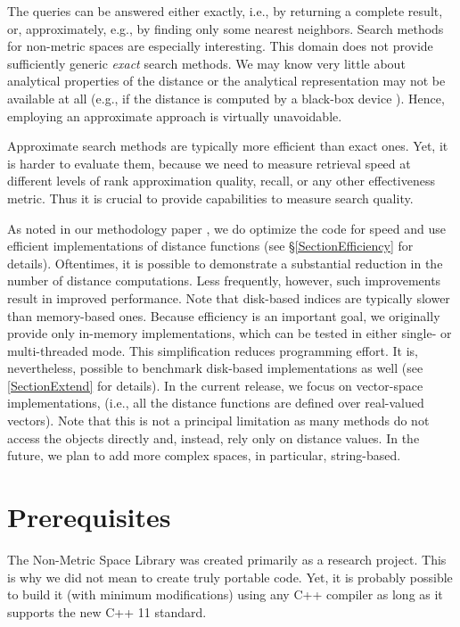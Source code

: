 \documentclass[runningheads,a4paper]{llncs}
\begin{document}
{The queries can be answered either exactly, 
i.e., by returning a complete result, or, 
approximately, e.g., by finding only some nearest neighbors.
Search methods for non-metric spaces are especially interesting.
This domain does not provide sufficiently generic \emph{exact} search methods.
We may know very little about analytical properties of the distance
or the analytical representation may not be available at all (e.g., if the 
distance is computed by a black-box device \cite{Skopal:2007}).
Hence, employing an approximate approach is virtually unavoidable.

Approximate search methods are typically more efficient than exact ones.
Yet, it is harder to evaluate them,
because we need to measure retrieval speed at different levels of 
rank approximation quality, recall, or any other effectiveness metric.
Thus it is crucial to provide capabilities to measure search quality.

As noted in our methodology paper \cite{Boytsov_and_Bilegsaikhan:sisap2013},
we do optimize the code for speed and use efficient implementations of distance functions 
(see \S \ref{SectionEfficiency} for details).
Oftentimes, it is possible to demonstrate a substantial reduction in the number
of distance computations. 
Less frequently, however, such improvements result in improved performance.
Note that  disk-based indices are typically
slower than memory-based ones. 
Because efficiency is an important goal,
we originally provide only in-memory implementations,
which can be tested in either single- or multi-threaded mode.
This simplification reduces programming effort.
It is, nevertheless, possible to benchmark disk-based implementations as well (see \ref{SectionExtend} for details).
In the current release, we focus on vector-space implementations,
(i.e., all the distance functions are defined over real-valued vectors). 
Note that this is not a principal limitation as many methods do not access the objects
directly and, instead, rely only on distance values.
In the future, we plan to add more complex spaces, in particular, string-based.


\section{Prerequisites}
The Non-Metric Space Library was created primarily as a research project.
This is why we did not mean to create truly portable code.
Yet, it is probably possible to build it (with minimum modifications) 
using any C++ compiler as long as it supports the new C++ 11 standard.

}
\end{document}
